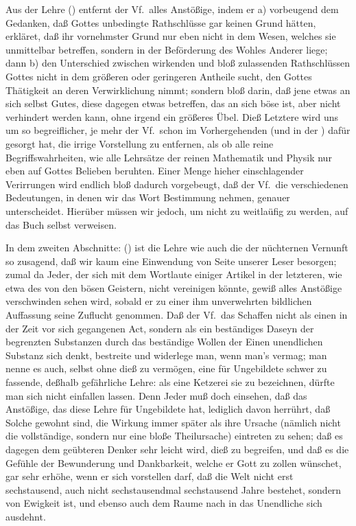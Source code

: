 Aus der Lehre  () entfernt der Vf.\ alles Anstößige, indem er a) vorbeugend dem Gedanken, daß Gottes unbedingte Rathschlüsse gar keinen Grund hätten, erkläret, daß ihr vornehmster Grund nur eben nicht in dem Wesen, welches sie unmittelbar betreffen, sondern in der Beförderung des Wohles Anderer liege; dann b) den Unterschied zwischen wirkenden und bloß zulassenden Rathschlüssen Gottes nicht in dem größeren oder geringeren Antheile sucht, den Gottes Thätigkeit an deren Verwirklichung nimmt; sondern bloß darin, daß jene etwas an sich selbst Gutes, diese dagegen etwas betreffen, das an sich böse ist, aber nicht verhindert werden kann, ohne irgend ein größeres Übel. Dieß Letztere wird uns um so begreiflicher, je mehr der Vf.\ schon im Vorhergehenden (und in der ) dafür gesorgt hat, die irrige Vorstellung zu entfernen, als ob alle reine Begriffswahrheiten, wie alle Lehrsätze der reinen Mathematik und Physik nur eben auf Gottes Belieben beruhten. Einer Menge hieher einschlagender Verirrungen wird endlich bloß dadurch vorgebeugt, daß der Vf.\ die verschiedenen Bedeutungen, in denen wir das Wort Bestimmung nehmen, genauer unterscheidet. Hierüber müssen wir jedoch, um nicht zu weitlaüfig zu werden, auf das Buch selbst verweisen. \par
In dem zweiten Abschnitte:  () ist die Lehre  wie auch die  der nüchternen Vernunft so zusagend, daß wir kaum eine Einwendung von Seite unserer Leser besorgen; zumal da Jeder, der sich mit dem Wortlaute einiger Artikel in der letzteren, wie etwa des von den bösen Geistern, nicht vereinigen könnte, gewiß alles Anstößige verschwinden sehen wird, sobald er zu einer ihm unverwehrten bildlichen Auffassung seine Zuflucht genommen. Daß der Vf.\ das Schaffen nicht als einen in der Zeit vor sich gegangenen Act, sondern als ein beständiges Daseyn der begrenzten Substanzen durch das beständige Wollen der Einen unendlichen Substanz sich denkt, bestreite und widerlege man, wenn man's vermag; man nenne es auch, selbst ohne dieß zu vermögen, eine für Ungebildete schwer zu fassende, deßhalb gefährliche Lehre: als eine Ketzerei sie zu bezeichnen, dürfte man sich nicht einfallen lassen. Denn Jeder muß doch einsehen, daß das Anstößige, das diese Lehre für Ungebildete hat, lediglich davon herrührt, daß Solche gewohnt sind, die Wirkung immer später als ihre Ursache (nämlich nicht die vollständige, sondern nur eine bloße Theilursache) eintreten zu sehen; daß es dagegen dem geübteren Denker sehr leicht wird, dieß zu begreifen, und daß es die Gefühle der Bewunderung und Dankbarkeit, welche er Gott zu zollen wünschet, gar sehr erhöhe, wenn er sich vorstellen darf, daß die Welt nicht erst sechstausend, auch nicht sechstausendmal sechstausend Jahre bestehet, sondern von Ewigkeit ist, und ebenso auch dem Raume nach in das Unendliche sich ausdehnt. \par
